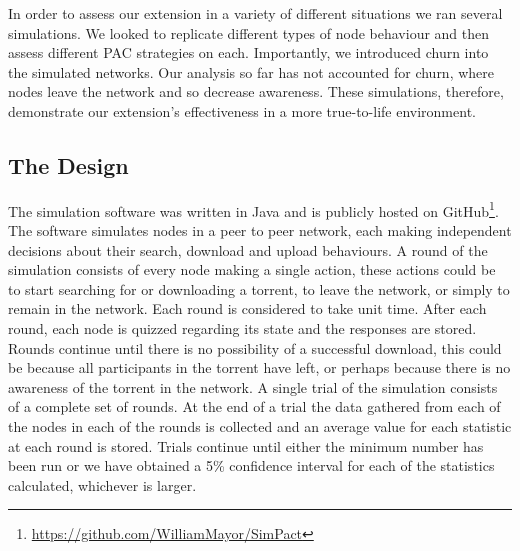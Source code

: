 In order to assess our extension in a variety of different situations we ran several simulations. We looked to replicate different types of node behaviour and then assess different PAC strategies on each. Importantly, we introduced churn into the simulated networks. Our analysis so far has not accounted for churn, where nodes leave the network and so decrease awareness. These simulations, therefore, demonstrate our extension's effectiveness in a more true-to-life environment.

\subsection{The Design}

    The simulation software was written in Java and is publicly hosted on GitHub\footnote{\url{https://github.com/WilliamMayor/SimPact}}. The software simulates nodes in a peer to peer network, each making independent decisions about their search, download and upload behaviours. A round of the simulation consists of every node making a single action, these actions could be to start searching for or downloading a torrent, to leave the network, or simply to remain in the network. Each round is considered to take unit time. After each round, each node is quizzed regarding its state and the responses are stored. Rounds continue until there is no possibility of a successful download, this could be because all participants in the torrent have left, or perhaps because there is no awareness of the torrent in the network. A single trial of the simulation consists of a complete set of rounds. At the end of a trial the data gathered from each of the nodes in each of the rounds is collected and an average value for each statistic at each round is stored. Trials continue until either the minimum number has been run or we have obtained a 5\% confidence interval for each of the statistics calculated, whichever is larger.

